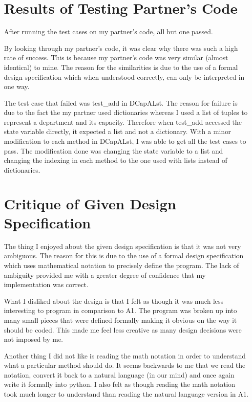 \documentclass[12pt]{article}
\begin{document}
\section{Results of Testing Partner's Code}

  After running the test cases on my partner's code, all but one passed.

  By looking through my partner's code, it was clear why there was such a high rate of success.
  This is because my partner's code was very similar (almost identical) to mine.
  The reason for the similarities is due to the use of a formal design specification which when understood correctly,
  can only be interpreted in one way.

  The test case that failed was test\_add in DCapALst.
  The reason for failure is due to the fact the my partner used dictionaries whereas I used a list of tuples to
  represent a department and its capacity.
  Therefore when test\_add accessed the state variable directly, it expected a list and not a dictionary.
  With a minor modification to each method in DCapALst, I was able to get all the test cases to pass.
  The modification done was changing the state variable to a list and changing the indexing in each method to the one
  used with lists instead of dictionaries.

\section{Critique of Given Design Specification}

  The thing I enjoyed about the given design specification is that it was not very ambiguous.
  The reason for this is due to the use of a formal design specification which uses mathematical notation to
  precisely define the program.
  The lack of ambiguity provided me with a greater degree of confidence that my implementation was correct.

  What I disliked about the design is that I felt as though it was much less interesting to program in comparison to A1.
  The program was broken up into many small pieces that were defined formally making it obvious on the way
  it should be coded.
  This made me feel less creative as many design decisions were not imposed by me.

  Another thing I did not like is reading the math notation in order to understand what a particular method should do.
  It seems backwards to me that we read the notation, convert it back to a natural language (in our mind) and
  once again write it formally into python.
  I also felt as though reading the math notation took much longer to understand than reading the natural language
  version in A1.
\end{document}
